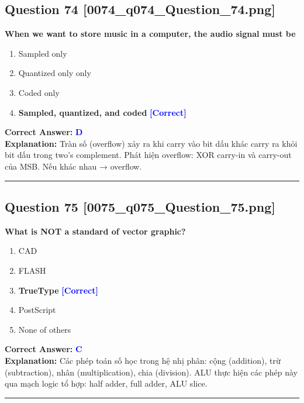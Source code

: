 \documentclass[11pt,a4paper]{article}
\begin{document}
\begin{minipage}{\textwidth}
\subsection*{Question 74 \quad \footnotesize{[0074\_q074\_Question\_74.png]}}
\noindent \textbf{When we want to store music in a computer, the audio signal must be}

\begin{enumerate}[label=\Alph*.]
    \item Sampled only
    \item Quantized only only
    \item Coded only
    \item \textbf{Sampled, quantized, and coded} \hfill \textcolor{blue}{\textbf{[Correct]}}
\end{enumerate}

\noindent \textbf{Correct Answer:} \textcolor{blue}{\textbf{D}} \\[2pt]
\noindent \textbf{Explanation:} Tràn số (overflow) xảy ra khi carry vào bit dấu khác carry ra khỏi bit dấu trong two's complement. Phát hiện overflow: XOR carry-in và carry-out của MSB. Nếu khác nhau → overflow.

\par\vspace{0.3cm}
\hrule
\vspace{0.3cm}
\end{minipage}

\begin{minipage}{\textwidth}
\subsection*{Question 75 \quad \footnotesize{[0075\_q075\_Question\_75.png]}}
\noindent \textbf{What is NOT a standard of vector graphic?}

\begin{enumerate}[label=\Alph*.]
    \item CAD
    \item FLASH
    \item \textbf{TrueType} \hfill \textcolor{blue}{\textbf{[Correct]}}
    \item PostScript
    \item None of others
\end{enumerate}

\noindent \textbf{Correct Answer:} \textcolor{blue}{\textbf{C}} \\[2pt]
\noindent \textbf{Explanation:} Các phép toán số học trong hệ nhị phân: cộng (addition), trừ (subtraction), nhân (multiplication), chia (division). ALU thực hiện các phép này qua mạch logic tổ hợp: half adder, full adder, ALU slice.

\par\vspace{0.3cm}
\hrule
\vspace{0.3cm}
\end{minipage}
\end{document}
